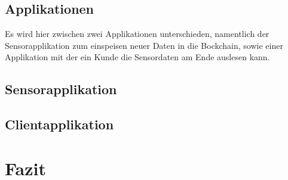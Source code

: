 \documentclass[12pt]{report}
\begin{document}
\section{Applikationen}
Es wird hier zwischen zwei Applikationen unterschieden, namentlich der Sensorapplikation zum einspeisen neuer Daten in die Bockchain, sowie einer Applikation mit der ein Kunde die Sensordaten am Ende auslesen kann.

\section{Sensorapplikation}

\section{Clientapplikation}

\chapter{Fazit}




\end{document}
